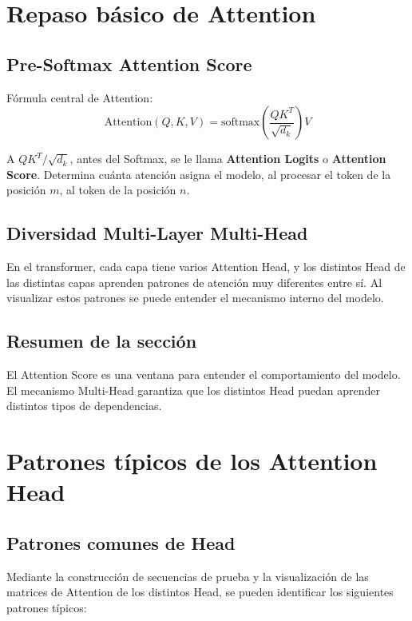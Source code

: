 \documentclass[a4paper]{article}
\begin{document}
\section{Repaso básico de Attention}

\subsection{Pre-Softmax Attention Score}

Fórmula central de Attention:
$$
\text{Attention}(Q, K, V) = \text{softmax}\left(\frac{QK^T}{\sqrt{d_k}}\right) V
$$

A $QK^T / \sqrt{d_k}$, antes del Softmax, se le llama \textbf{Attention Logits} o \textbf{Attention Score}. Determina cuánta atención asigna el modelo, al procesar el token de la posición $m$, al token de la posición $n$.

\subsection{Diversidad Multi-Layer Multi-Head}

En el transformer, cada capa tiene varios Attention Head, y los distintos Head de las distintas capas aprenden patrones de atención muy diferentes entre sí. Al visualizar estos patrones se puede entender el mecanismo interno del modelo.

\subsection{Resumen de la sección}

El Attention Score es una ventana para entender el comportamiento del modelo. El mecanismo Multi-Head garantiza que los distintos Head puedan aprender distintos tipos de dependencias.

\section{Patrones típicos de los Attention Head}

\subsection{Patrones comunes de Head}

Mediante la construcción de secuencias de prueba y la visualización de las matrices de Attention de los distintos Head, se pueden identificar los siguientes patrones típicos:
\end{document}
